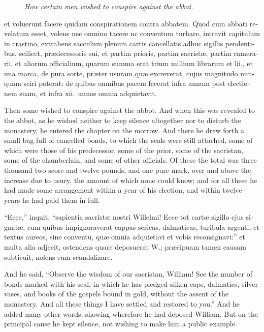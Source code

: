 \documentclass{book}
\newcommand{\blockhead}[4][]{
\begin{figure}
\centering
\vspace{#4}
\parbox{2.75cm}{\begin{center}\footnotesize \color{BrickRed} \emph{#2}\\ #1 \end{center}}
\end{figure}
}
\begin{document}
\begin{paracol}{2}
\begin{otherlanguage}{latin}
\blockhead{How certain men wished to conspire against the abbot.}{3}{-0.55cm}
et voluerunt facere quidam conspirationem contra abbatem. Quod cum abbati revelatum esset, volens nec omnino tacere nc conventum turbare, intravit capitulum in crastino, extrahens sacculum plenum cartis cancellatis adhuc sigillis pendentibus, scilicet, pr\ae{}decessoris sui, et partim prioris, partim sacrist\ae{}, partim camerarii, et aliorum officialium, quarum summa erat trium millium librarum et lii., et una marca, de pura sorte, pr\ae{}ter usuram qu\ae{} excreverat, cujus magnitudo nunquam sciri poterat: de quibus omnibus pacem fecerat infra annum post electionem suam, et infra xii.\ annos omnia adquietavit.

\end{otherlanguage}

\switchcolumn

Then some wished to conspire against the abbot. And when this was revealed to the abbot, as he wished neither to keep silence altogether nor to disturb the monastery, he entered the chapter on the morrow. And there he drew forth a small bag full of cancelled bonds, to which the seals were still attached, some of which were those of his predecessor, some of the prior, some of the sacristan, some of the chamberlain, and some of other officials. Of these the total was three thousand two score and twelve pounds, and one pure mark, over and above the increase due to usury, the amount of which none could know; and for all these he had made some arrangement within a year of his election, and within twelve years he had paid them in full.

\switchcolumn*

\begin{otherlanguage}{latin}
``Ecce,'' inquit, ``sapientia sacrist\ae{} nostri Willelmi! Ecce tot cart\ae{} sigillo ejus signat\ae{}, cum quibus impignoraverat cappas sericas, dalmaticas, turibula argenti, et textus aureos, sine conventu, qu\ae{} omnia adquietavi et vobis reconsignavi:'' et multa alia adjecit, ostendens quare deposuerat W.; pr\ae{}cipuam tamen causam subticuit, nolens eum scandalizare.
\end{otherlanguage}

\switchcolumn

And he said, ``Observe the wisdom of our sacristan, William! See the number of bonds marked with his seal, in which he has pledged silken caps, dalmatics, silver vases, and books of the gospels bound in gold, without the assent of the monastery. And all these things I have settled and restored to you.'' And he added many other words, showing wherefore he had deposed William. But on the principal cause he kept silence, not wishing to make him a public example.


\end{paracol}
\end{document}

